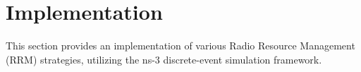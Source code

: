 \section{Implementation}
\label{chap:impl:sec:implementation}
This section provides an implementation of various Radio Resource Management (RRM) strategies, utilizing the ns-3 discrete-event simulation framework.






